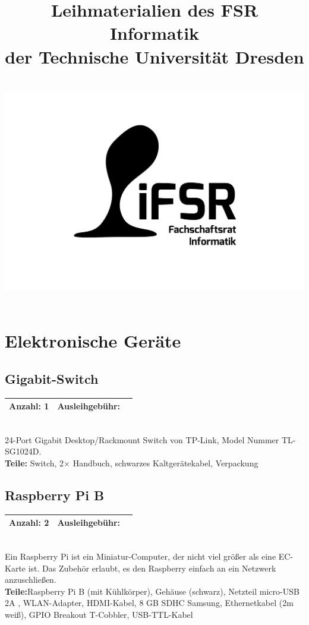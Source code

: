 \documentclass[a4paper]{article}
\newcommand{\iFSR}{FSR Informatik}
\newcommand{\infobox}[3] %
        {\par
                \begin{tabular}{| c | c | c| }
                \hline
                Anzahl: #1 & Ausleihgebühr: \EUR{#2}   \\
                \hline
                \end{tabular} \\
        }
\begin{document}
\title{\bf Leihmaterialien des \iFSR \\
        der Technische Universität Dresden \\~\\
         \includegraphics[width=.3\textwidth]{fsrlogo}
}

\maketitle


\tableofcontents


\pagebreak

\section{Elektronische Geräte}

\subsection{Gigabit-Switch}
\infobox{1}{1}{Neu}
24-Port Gigabit Desktop/Rackmount Switch von TP-Link, Model Nummer TL-SG1024D. \\
\textbf{ Teile:} Switch, 2$\times$ Handbuch, schwarzes Kaltgerätekabel, Verpackung


\subsection{Raspberry Pi B}
\infobox{2}{1}{Neu}
Ein Raspberry Pi ist ein Miniatur-Computer, der nicht viel größer als eine EC-Karte ist. Das Zubehör erlaubt, es den Raspberry einfach an ein Netzwerk anzuschließen. \\
\textbf{Teile:}Raspberry Pi B (mit Kühlkörper), Gehäuse (schwarz), Netzteil micro-USB 2A , WLAN-Adapter, HDMI-Kabel, 8 GB SDHC Samsung, Ethernetkabel (2m weiß), GPIO Breakout T-Cobbler, USB-TTL-Kabel 
\end{document}
